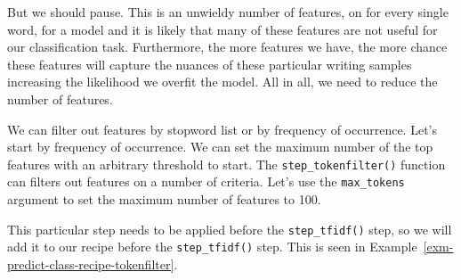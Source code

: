 \documentclass[
  letterpaper,
  krantz1]{latex/krantz-mod}
\theoremstyle{definition}
\theoremstyle{definition}
\theoremstyle{remark}
\begin{document}
But we should pause. This is an unwieldy number of features, on for
every single word, for a model and it is likely that many of these
features are not useful for our classification task. Furthermore, the
more features we have, the more chance these features will capture the
nuances of these particular writing samples increasing the likelihood we
overfit the model. All in all, we need to reduce the
number of features.

We can filter out features by stopword list or by
frequency of occurrence. Let's start by frequency of
occurrence. We can set the maximum number of the top features with an
arbitrary threshold to start. The \texttt{step\_tokenfilter()} function
can filters out features on a number of criteria. Let's use the
\texttt{max\_tokens} argument to set the maximum number of features to
100.

This particular step needs to be applied before the
\texttt{step\_tfidf()} step, so we will add it to our recipe before the
\texttt{step\_tfidf()} step. This is seen in
Example~\ref{exm-predict-class-recipe-tokenfilter}.
\end{document}
